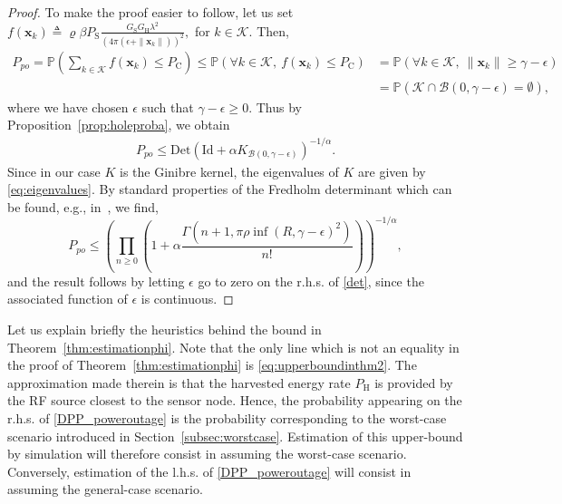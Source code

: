 \documentclass[12pt,draftclsnofoot,onecolumn]{IEEEtran}
\begin{document}
\begin{proof}
To make the proof easier to follow, let us set
$
f(\mathbf{x}_k)\triangleq \varrho\beta P_{\mathrm{S}} \frac{G_{\mathrm{S}} G_{\mathrm{H}} \lambda^{2}}{(4\pi (\epsilon+\|\mathbf{x}_k\|))^{2}},
$
for $k\in\mathcal{K}$. Then,
\begin{align}
\label{eq:upperboundinthm2}
P_{po}	 
	=\mathbb{P} \left(\sum_{k\in\mathcal{K}} f(\mathbf{x}_k) \le P_{\mathrm{C}}\right) \le \mathbb{P} (\forall k \in\mathcal{K},\ f(\mathbf{x}_k) \le P_{\mathrm{C}})
	&= \mathbb{P} (\forall k \in\mathcal{K},\ \|\mathbf{x}_k\| \ge \gamma -\epsilon ) \\&= \mathbb{P} (\mathcal{K}\cap\mathcal{B}(0,\gamma-\epsilon) = \emptyset ),\nonumber
\end{align}
where we have chosen $\epsilon$ such that $\gamma-\epsilon\ge 0$. Thus by Proposition~\ref{prop:holeproba}, we obtain
\begin{eqnarray}\label{det}
P_{po}  \le \mathrm{Det}(\mathrm{Id}+\alpha K_{\mathcal{B}(0,\gamma-\epsilon)})^{-1/\alpha}.
\end{eqnarray}
Since in our case $K$ is the Ginibre kernel, the eigenvalues of $K$ are given by \eqref{eq:eigenvalues}. By standard properties of the Fredholm determinant which can be found, e.g., in~\cite{Brezis}, we find,
\begin{equation*}
P_{po}  
\le  \left(\prod_{n\ge 0} \left(1+\alpha  \frac{\Gamma(n+1, \pi\rho \inf(R,\gamma-\epsilon)^2)}{n!}\right)\right)^{-1/\alpha},
\end{equation*}
and the result follows by letting $\epsilon$ go to zero on the r.h.s. of \eqref{det}, since the associated function of $\epsilon$ is continuous.
\end{proof}

Let us explain briefly the heuristics behind the bound in Theorem~\ref{thm:estimationphi}. Note that the only line which is not an equality in the proof of Theorem~\ref{thm:estimationphi} is \eqref{eq:upperboundinthm2}. The approximation made therein is that the harvested energy rate $P_{\mathrm H}$ is provided by the RF source closest to the sensor node. Hence, the probability appearing on the r.h.s. of \eqref {DPP_poweroutage} is the probability corresponding to the worst-case scenario introduced in Section~\ref{subsec:worstcase}. Estimation of this upper-bound by simulation will therefore consist in assuming the worst-case scenario. Conversely, estimation of the l.h.s. of \eqref{DPP_poweroutage} will consist in assuming the general-case scenario.
\end{document}
